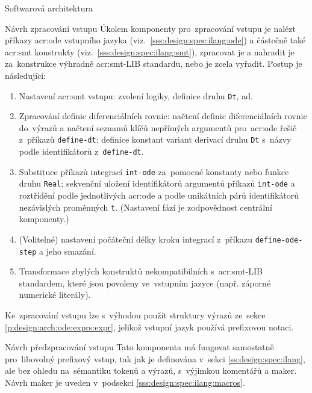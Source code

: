 \documentclass[thesis=M,czech]{FITthesis}[2012/06/26]
\newcommand{\acrlabel}[1]{acr:#1}
\newcommand{\acr}[1]{\acrshort{\acrlabel{#1}}}
\newcommand{\id}[1]{\texttt{#1}}
\newcommand{\rf}[1]{\ref{#1}}
\begin{document}
\begin{section}{Softwarová architektura}
\begin{subsection}{Návrh zpracování vstupu}\label{ss:design:arch:parse}
Úkolem komponenty pro~zpracování vstupu
je nalézt příkazy \acr{ode} vstupního jazyka
(viz.~\rf{sss:design:spec:ilang:ode})
a částečně také \acr{smt} konstrukty
(viz.~\rf{sss:design:spec:ilang:smt}),
zpracovat je a nahradit je za~konstrukce
výhradně \acr{smt}-LIB standardu,
nebo je zcela vyřadit.
Postup je následující:
\begin{enumerate}
\item Nastavení \acr{smt} vstupu: zvolení logiky,
   definice druhu \id{Dt}, ad.
\item Zpracování definic diferenciálních rovnic:
   načtení definic diferenciálních rovnic do~výrazů
   a načtení seznamů klíčů nepřímých argumentů pro~\acr{ode} řešič
   z~příkazů \id{define\--dt};
   definice konstant variant derivací druhu \id{Dt}
   s~názvy podle identifikátorů z~\id{define\--dt}.
\item Substituce příkazů integrací \id{int\--ode}
   za~pomocné konstanty nebo funkce druhu \id{Real};
   sekvenční uložení identifikátorů argumentů příkazů \id{int\--ode}
   a roztřídění podle jednotlivých \acr{ode}
   a podle unikátních párů identifikátorů nezávislých proměnných \id{t}.
   (Nastavení fází je zodpovědnost centrální komponenty.)
\item (Volitelné) nastavení počáteční délky kroku integrací
   z~příkazu \id{define\--ode\--step} a jeho smazání.
\item Transformace zbylých konstruktů nekompatibilních
   s~\acr{smt}-LIB standardem, které jsou povoleny ve~vstupním jazyce
   (např. záporné numerické literály).
\end{enumerate}

Ke~zpracování vstupu lze s~výhodou
použít struktury výrazů
ze~sekce \rf{p:design:arch:ode:exprs:expr},
jelikož vstupní jazyk používá prefixovou notaci.
\end{subsection} %


\begin{subsection}{Návrh předzpracování vstupu}
\label{ss:design:arch:preprocess}
Tato komponenta má fungovat samostatně pro~libovolný prefixový vstup,
tak jak je definována v~sekci \rf{ss:design:spec:ilang},
ale bez ohledu na~sémantiku tokenů a výrazů,
s~výjimkou komentářů a maker.
Návrh maker je uveden v~podsekci \rf{sss:design:spec:ilang:macros}.


\end{subsection}
\end{section}
\end{document}
